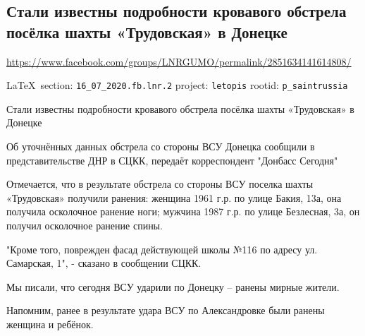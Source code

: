  
 
  
 
\subsection{Стали известны подробности кровавого обстрела посёлка шахты «Трудовская» в Донецке}
\url{https://www.facebook.com/groups/LNRGUMO/permalink/2851634141614808/}

\vspace{0.5cm}
{\small\LaTeX~section: \verb|16_07_2020.fb.lnr.2| project: \verb|letopis| rootid: \verb|p_saintrussia|}
\vspace{0.5cm}

Стали известны подробности кровавого обстрела посёлка шахты «Трудовская» в
Донецке

Об уточнённых данных обстрела со стороны ВСУ Донецка сообщили в
представительстве ДНР в СЦКК, передаёт корреспондент "Донбасс Сегодня"

Отмечается, что в результате обстрела со стороны ВСУ поселка шахты «Трудовская»
получили ранения: женщина 1961 г.р. по улице Бакия, 13а, она получила
осколочное ранение ноги; мужчина 1987 г.р. по улице Безлесная, 3а, он получил
осколочное ранение спины.

"Кроме того, поврежден фасад действующей школы №116 по адресу ул. Самарская,
1", - сказано в сообщении СЦКК.

Мы писали, что сегодня ВСУ ударили по Донецку – ранены мирные жители.

Напомним, ранее в результате удара ВСУ по Александровке были ранены женщина и
ребёнок.
